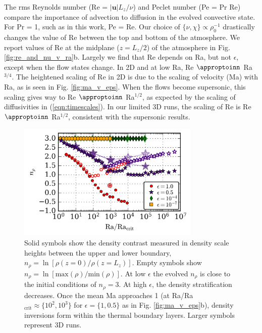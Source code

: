 \documentclass[aps, prl, twocolumn, nofootinbib, groupedaddress, amsfonts, amssymb, amsmath]{revtex4-1}
\newcommand{\approptoinn}[2]{\mathrel{\vcenter{
	\offinterlineskip\halign{\hfil$##$\cr
	#1\propto\cr\noalign{\kern2pt}#1\sim\cr\noalign{\kern-2pt}}}}}
\newcommand{\appropto}{\mathpalette\approptoinn\relax}
\begin{document}
The rms Reynolds number (Re = $|\bm{u}|L_z/\nu$) and Peclet number
(Pe = Pr Re)
compare the importance of advection to diffusion in the evolved
convective state.  For Pr = 1, such as in this work, Pe = Re.  
Our choice of $\{\nu,\chi\}\propto \rho_0^{-1}$ drastically changes
the value of Re between the top and bottom of the atmosphere.  We report values of
Re at the midplane ($z=L_z/2$) of the atmosphere in
Fig. \ref{fig:re_and_nu_v_ra}b.  Largely we find that Re
depends on Ra, but not $\epsilon$, except when the flow states
change.
In 2D and at low Ra, Re $\appropto$ Ra$^{3/4}$.  The heightened scaling
of Re in 2D is due to the scaling of velocity (Ma) with Ra, as is
seen in Fig. \ref{fig:ma_v_eps}.  When the flows
become supersonic, 
this scaling gives way to Re $\appropto$ Ra$^{1/2}$, as expected
by the scaling of diffusivities in (\ref{eqn:timescales}).
In our limited 3D runs, the scaling of Re is
Re $\appropto$ Ra$^{1/2}$, consistent with the supersonic results.

\begin{figure}[t]
\includegraphics[width=3.4375in]{./figs/density_v_ra.png}
\caption{\label{fig:nrho_v_ra} 
Solid symbols show the density contrast measured
in density scale heights between the upper and lower boundary, 
$n_\rho = \ln[\rho(z=0)/\rho(z=L_z)]$.
Empty symbols show 
$n_\rho = \ln[\text{max}(\rho)/\text{min}(\rho)]$. 
At low $\epsilon$ the evolved
$n_{\rho}$ is close to the initial conditions of $n_\rho = 3$.  
At high $\epsilon$,
the density stratification decreases.  Once the mean 
Ma approaches 1 (at Ra/Ra$_{\text{crit}} \approx \{10^2, 10^3\}$ for $\epsilon = \{1, 0.5\}$
as in Fig. \ref{fig:ma_v_eps}b), density inversions form within the thermal
boundary layers. Larger symbols represent 3D runs.}
\end{figure}
\end{document}
